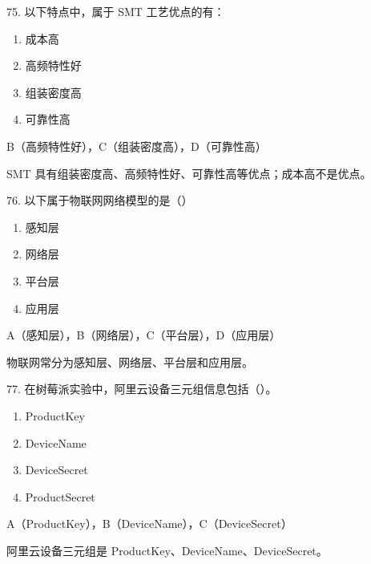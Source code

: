 \begin{question}{75. 以下特点中，属于 SMT 工艺优点的有：}
\begin{enumerate}[label=\Alph*., leftmargin=2.4em, itemsep=0.2em]
\item 成本高
\item 高频特性好
\item 组装密度高
\item 可靠性高
\end{enumerate}
\end{question}
\begin{answer}
B（高频特性好），C（组装密度高），D（可靠性高）
\end{answer}
\begin{explanation}
SMT 具有组装密度高、高频特性好、可靠性高等优点；成本高不是优点。
\end{explanation}

\begin{question}{76. 以下属于物联网网络模型的是（）}
\begin{enumerate}[label=\Alph*., leftmargin=2.4em, itemsep=0.2em]
\item 感知层
\item 网络层
\item 平台层
\item 应用层
\end{enumerate}
\end{question}
\begin{answer}
A（感知层），B（网络层），C（平台层），D（应用层）
\end{answer}
\begin{explanation}
物联网常分为感知层、网络层、平台层和应用层。
\end{explanation}

\begin{question}{77. 在树莓派实验中，阿里云设备三元组信息包括（）。}
\begin{enumerate}[label=\Alph*., leftmargin=2.4em, itemsep=0.2em]
\item ProductKey
\item DeviceName
\item DeviceSecret
\item ProductSecret
\end{enumerate}
\end{question}
\begin{answer}
A（ProductKey），B（DeviceName），C（DeviceSecret）
\end{answer}
\begin{explanation}
阿里云设备三元组是 ProductKey、DeviceName、DeviceSecret。
\end{explanation}

